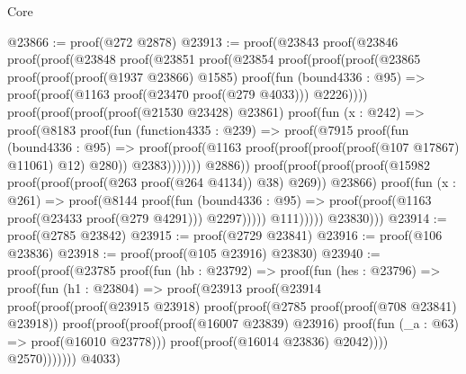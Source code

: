\begin{lexlean}{Core}
\begin{coremodule}
@23866 := proof(@272 @2878)
@23913 := proof(@23843
      proof(@23846
          proof(proof(@23848
                proof(@23851
                    proof(@23854
                        proof(proof(proof(@23865
                                proof(proof(proof(@1937 @23866) @1585)
                                    proof(fun (bound4336 : @95) =>
                                      proof(proof(@1163 proof(@23470 proof(@279 @4033))) @2226))))
                              proof(proof(proof(proof(@21530 @23428) @23861)
                                    proof(fun (x : @242) =>
                                      proof(@8183
                                          proof(fun (function4335 : @239) =>
                                            proof(@7915
                                                proof(fun (bound4336 : @95) =>
                                                  proof(proof(@1163
                                                        proof(proof(proof(proof(@107 @17867) @11061)
                                                              @12)
                                                            @280))
                                                      @2383)))))))
                                  @2886))
                            proof(proof(proof(proof(@15982
                                      proof(proof(proof(@263 proof(@264 @4134)) @38) @269))
                                    @23866)
                                  proof(fun (x : @261) =>
                                    proof(@8144
                                        proof(fun (bound4336 : @95) =>
                                          proof(proof(@1163 proof(@23433 proof(@279 @4291)))
                                              @2297)))))
                                @111)))))
              @23830)))
@23914 := proof(@2785 @23842)
@23915 := proof(@2729 @23841)
@23916 := proof(@106 @23836)
@23918 := proof(proof(@105 @23916) @23830)
@23940 := proof(proof(@23785
        proof(fun (hb : @23792) =>
          proof(fun (hes : @23796) =>
            proof(fun (h1 : @23804) =>
              proof(@23913
                  proof(@23914
                      proof(proof(proof(@23915 @23918)
                            proof(proof(@2785 proof(proof(@708 @23841) @23918))
                                proof(proof(proof(proof(@16007 @23839) @23916)
                                      proof(fun (_a : @63) => proof(@16010 @23778)))
                                    proof(proof(@16014 @23836) @2042))))
                          @2570)))))))
      @4033)

\end{coremodule}
\end{lexlean}
